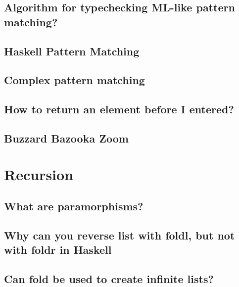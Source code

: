\documentclass{book}%
\begin{document}
\section{Algorithm for typechecking ML-like pattern matching?}


\section{Haskell Pattern Matching}


\section{Complex pattern matching}


\section{How to return an element before I entered?}


\section{Buzzard Bazooka Zoom}




\chapter{Recursion}

\section{What are paramorphisms?}


\section{Why can you reverse list with foldl, but not with foldr in Haskell}


\section{Can fold be used to create infinite lists?}

\end{document}
